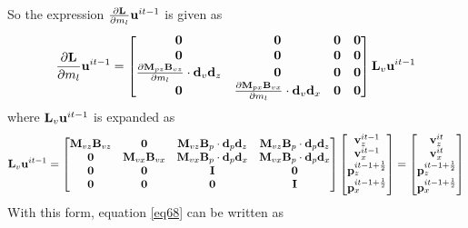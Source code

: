 \documentclass[revised,endfloat]{geophysics}
\begin{document}
So the expression $\frac{\partial {\bf L}}{\partial m_l} {\bf u}^{it-1}$ is given as
\begin{equation}
\frac{\partial {\bf L}}{\partial m_l} {\bf u}^{it-1} =  
\begin{bmatrix}
\bf{0}   & \bf{0}   & \bf{0} & \bf{0}   \\
\bf{0}   & \bf{0}   & \bf{0} & \bf{0}   \\
\frac{{\partial \bf M}_{pz}{\bf B}_{vz}}{\partial m_l} \cdot {\bf d}_v{\bf d}_z & \bf{0} & {\bf 0} & \bf{0}   \\ 
\bf{0} & \frac{{\partial \bf M}_{px}{\bf B}_{vx}}{\partial m_l} \cdot {\bf d}_v{\bf d}_x & \bf{0} & {\bf 0} \\ 
\end{bmatrix}
{\bf L}_v  {\bf u}^{it-1} 
\label{eq68}
\end{equation}
where ${\bf L}_v  {\bf u}^{it-1} $ is expanded as 
\begin{equation}
{\bf L}_v  {\bf u}^{it-1}  = 
\begin{bmatrix}
{\bf M}_{vz}{\bf B}_{vz} & \bf{0} & {\bf M}_{vz}{\bf B}_{p} \cdot {\bf d}_p{\bf d}_z & {\bf M}_{vz}{\bf B}_{p} \cdot {\bf d}_p{\bf d}_z  \\
\bf{0} & {\bf M}_{vx}{\bf B}_{vx} & {\bf M}_{vx}{\bf B}_{p} \cdot {\bf d}_p{\bf d}_x & {\bf M}_{vx}{\bf B}_{p} \cdot {\bf d}_p{\bf d}_x \\
\bf{0}   & \bf{0}   & \bf{I}   & \bf{0}   \\
\bf{0}   & \bf{0}   & \bf{0}  & \bf{I}   
\end{bmatrix}
\begin{bmatrix}
{\bf v}_z^{it-1} \\
{\bf v}_x^{it-1} \\
{\bf p}_z^{it-1+\frac{1}{2}} \\
{\bf p}_x^{it-1+\frac{1}{2}} \\
\end{bmatrix}
=\begin{bmatrix}
{\bf v}_z^{it} \\
{\bf v}_x^{it} \\
{\bf p}_z^{it-1+\frac{1}{2}} \\
{\bf p}_x^{it-1+\frac{1}{2}} \\
\end{bmatrix}
\label{eq69}
\end{equation}
With this form, equation \ref{eq68} can be written as
\end{document}
